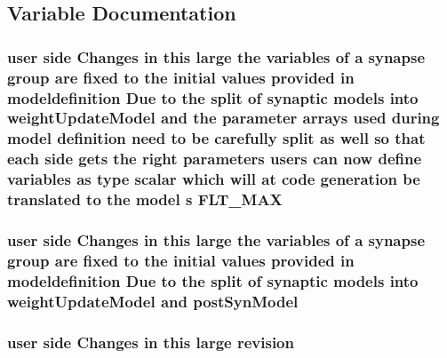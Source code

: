 \subsection{Variable Documentation}
\hypertarget{changesSummary_8txt_abc0a94bb02d525a6cc31f84e7ee6bffc}{
\subsubsection[{F\+L\+T\+\_\+\+M\+A\+X}]{\setlength{\rightskip}{0pt plus 5cm}user side Changes {\bf in} this large the variables of a synapse group are fixed {\bf to} the initial values provided {\bf in} modeldefinition Due {\bf to} the split of synaptic models into {\bf weight\+Update\+Model} and the parameter arrays used during {\bf model} definition need {\bf to} be carefully split as well so that each side gets the right parameters users can now define variables as {\bf type} {\bf scalar} which will at {\bf code} generation be translated {\bf to} the {\bf model} s F\+L\+T\+\_\+\+M\+A\+X}}\label{changesSummary_8txt_abc0a94bb02d525a6cc31f84e7ee6bffc}
\hypertarget{changesSummary_8txt_a7299bf581e667dd1bdc7788c980b3711}{
\subsubsection[{post\+Syn\+Model}]{\setlength{\rightskip}{0pt plus 5cm}user side Changes {\bf in} this large the variables of a synapse group are fixed {\bf to} the initial values provided {\bf in} modeldefinition Due {\bf to} the split of synaptic models into {\bf weight\+Update\+Model} and {\bf post\+Syn\+Model}}}\label{changesSummary_8txt_a7299bf581e667dd1bdc7788c980b3711}
\hypertarget{changesSummary_8txt_a161f8ef2ee21ae03c8fe9e8e094d132c}{
\subsubsection[{revision}]{\setlength{\rightskip}{0pt plus 5cm}user side Changes {\bf in} this large revision}}\label{changesSummary_8txt_a161f8ef2ee21ae03c8fe9e8e094d132c}

